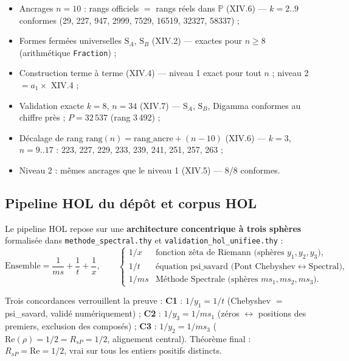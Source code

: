 \documentclass[11pt,a4paper]{article}
\newcommand{\SA}{\mathrm{S}_A}
\newcommand{\SB}{\mathrm{S}_B}
\begin{document}
\begin{boiteformule}
\begin{itemize}[nosep]
  \item Ancrages $n=10$ : rangs officiels $=$ rangs réels dans $\mathbb{P}$ (XIV.6) --- $k=2..9$ conformes (29, 227, 947, 2999, 7529, 16519, 32327, 58337) ;
  \item Formes fermées universelles $\SA$, $\SB$ (XIV.2) --- exactes pour $n \ge 8$ (arithmétique \texttt{Fraction}) ;
  \item Construction terme à terme (XIV.4) --- niveau 1 exact pour tout $n$ ; niveau 2 $= a_1 \times$ XIV.4 ;
  \item Validation exacte $k=8$, $n=34$ (XIV.7) --- $\SA$, $\SB$, Digamma conformes au chiffre près ; $P = 32\,537$ (rang 3\,492) ;
  \item Décalage de rang $\text{rang}(n) = \text{rang\_ancre} + (n-10)$ (XIV.6) --- $k=3$, $n=9..17$ : 223, 227, 229, 233, 239, 241, 251, 257, 263 ;
  \item Niveau 2 : mêmes ancrages que le niveau 1 (XIV.5) --- 8/8 conformes.
\end{itemize}
\end{boiteformule}

\subsection{Pipeline HOL du dépôt et corpus HOL}

Le pipeline HOL repose sur une \textbf{architecture concentrique à trois
sphères} formalisée dans \texttt{methode\_spectral.thy} et
\texttt{validation\_hol\_unifiee.thy} :
\[
\text{Ensemble} = \frac{1}{ms} + \frac{1}{t} + \frac{1}{x},
\qquad
\begin{cases}
1/x & \text{fonction zêta de Riemann (sphères } y_1, y_2, y_3\text{)},\\
1/t & \text{équation psi\_savard (Pont Chebyshev} \leftrightarrow \text{Spectral)},\\
1/ms & \text{Méthode Spectrale (sphères } ms_1, ms_2, ms_3\text{)}.
\end{cases}
\]

Trois concordances verrouillent la preuve : \textbf{C1} : $1/y_1 = 1/t$
(Chebyshev $=$ psi\_savard, validé numériquement) ; \textbf{C2} :
$1/y_3 = 1/ms_1$ (zéros $\leftrightarrow$ positions des premiers, exclusion des
composés) ; \textbf{C3} : $1/y_2 = 1/ms_3$ ($\mathrm{Re}(\rho) = 1/2 = R_{sP} = 1/2$,
alignement central). Théorème final : $R_{sP} = \mathrm{Re} = 1/2$, vrai sur tous
les entiers positifs distincts.
\end{document}

